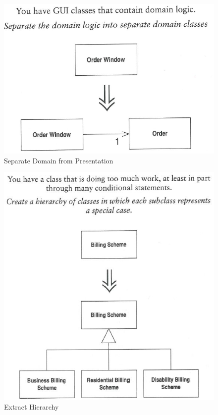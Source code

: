 \begin{figure}[h!]
	\centering
	\includegraphics[width=0.7\linewidth]{fig/separate-domain-from-presentation}
	\caption{Separate Domain from Presentation}
	\label{fig:separate-domain-from-presentation}
\end{figure}

\begin{figure}[h!]
	\centering
	\includegraphics[width=0.7\linewidth]{fig/extract-hierarchy}
	\caption{Extract Hierarchy}
	\label{fig:extract-hierarchy}
\end{figure}